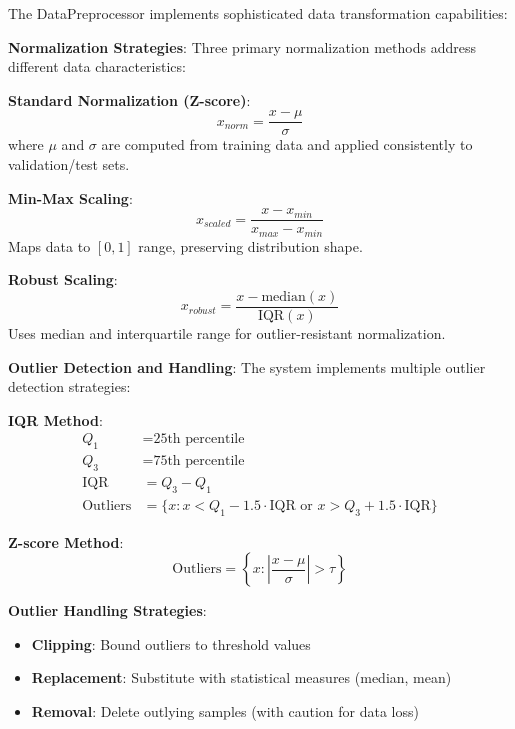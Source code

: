 \documentclass[11pt,a4paper]{report}
\begin{document}
The DataPreprocessor implements sophisticated data transformation capabilities:

\textbf{Normalization Strategies}: Three primary normalization methods address different data characteristics:

\textbf{Standard Normalization (Z-score)}:
\begin{equation}
x_{norm} = \frac{x - \mu}{\sigma}
\end{equation}
where $\mu$ and $\sigma$ are computed from training data and applied consistently to validation/test sets.

\textbf{Min-Max Scaling}:
\begin{equation}
x_{scaled} = \frac{x - x_{min}}{x_{max} - x_{min}}
\end{equation}
Maps data to $[0, 1]$ range, preserving distribution shape.

\textbf{Robust Scaling}:
\begin{equation}
x_{robust} = \frac{x - \text{median}(x)}{\text{IQR}(x)}
\end{equation}
Uses median and interquartile range for outlier-resistant normalization.

\textbf{Outlier Detection and Handling}: The system implements multiple outlier detection strategies:

\textbf{IQR Method}:
\begin{align}
Q_1 &= \text{25th percentile} \\
Q_3 &= \text{75th percentile} \\
\text{IQR} &= Q_3 - Q_1 \\
\text{Outliers} &= \{x : x < Q_1 - 1.5 \cdot \text{IQR} \text{ or } x > Q_3 + 1.5 \cdot \text{IQR}\}
\end{align}

\textbf{Z-score Method}:
\begin{equation}
\text{Outliers} = \left\{x : \left|\frac{x - \mu}{\sigma}\right| > \tau\right\}
\end{equation}

\textbf{Outlier Handling Strategies}:
\begin{itemize}
\item \textbf{Clipping}: Bound outliers to threshold values
\item \textbf{Replacement}: Substitute with statistical measures (median, mean)
\item \textbf{Removal}: Delete outlying samples (with caution for data loss)
\end{itemize}
\end{document}
